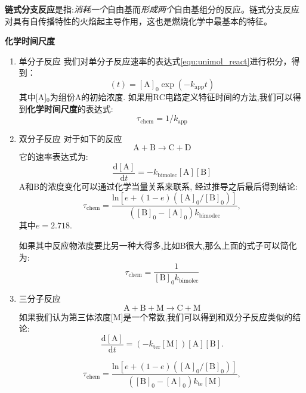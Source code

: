 \documentclass[10pt, landscape]{extarticle}
\numberwithin{equation}{section}
\newcommand{\dd}{\mathrm{d}}
\begin{document}
\begin{multicols}{3}
\textbf{链式分支反应}是指:\textit{消耗一个}自由基而\textit{形成两个}自由基组分的反应。链式分支反应对具有自传播特性的火焰起主导作用，这也是燃烧化学中最基本的特征。

\textbf{化学时间尺度}

\begin{enumerate}
    \item 单分子反应
    我们对单分子反应速率的表达式\ref{equ:unimol_react}进行积分，得到：
    \begin{equation}
        [\mathrm{A}](t)=[\mathrm{A}]_{0}\exp(-k_{\mathrm{app}}t)
    \end{equation}其中[A]\(_0\)为组份A的初始浓度. 如果用RC电路定义特征时间的方法,我们可以得到\textbf{化学时间尺度}的表达式:
    \begin{equation}
        \tau_\mathrm{chem} = 1/k_\mathrm{app}
    \end{equation}

    \item 双分子反应
    对于如下的反应
    \[
        \mathrm{A+B\rightarrow C+D}
    \]
    它的速率表达式为:
    \begin{equation}
        \frac{\dd [\mathrm{A}]}{\dd t}=-k_\mathrm{bimolec}\mathrm{[A][B]}
    \end{equation}
    A和B的浓度变化可以通过化学当量关系来联系, 经过推导之后最后得到结论:
    \begin{equation}
        \tau_{\mathrm{chem}}={\frac{\mathrm{ln}[e+(1-e)\mathrm{([A]_{0}/[B]_{0})}]}{([\mathrm{B}]_{0}-\mathrm{[A]}_{0})k_{\mathrm{bimodec}}}},
    \end{equation}其中\(e=2.718\).

    如果其中反应物浓度要比另一种大得多,比如B很大,那么上面的式子可以简化为:
    \begin{equation}
        \tau_\mathrm{chem}=\frac{1}{[\mathrm{B}]_0 k_\mathrm{bimolec}}
    \end{equation}

    \item 三分子反应
    \[\mathrm{A+B+M\rightarrow C + M}\]
    如果我们认为第三体浓度[M]是一个常数,我们可以得到和双分子反应类似的结论:
    \begin{equation}
        {\frac{\mathrm{d}[\mathrm{A}]}{\mathrm{d}t}}=(-k_{\mathrm{ter}}[\mathrm{M}])[\mathrm{A}][\mathrm{B}].
    \end{equation}

    \begin{equation}
        \tau_{\mathrm{chem}}={\frac{\mathrm{ln}[e+(1-e)([\mathrm{A}]_{0}/[\mathrm{B}]_{0})]}{([\mathrm{B}]_{0}-[\mathrm{A}]_{0})k_{\mathrm{te}}[\mathrm{M}]}},
    \end{equation}



\end{enumerate}
\end{multicols}
\end{document}
